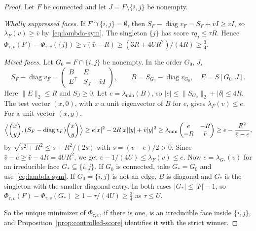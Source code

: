 \begin{proof}
Let $F$ be connected and let $J=F\setminus\{i,j\}$ be nonempty.

\emph{Wholly suppressed faces.} If $F\cap\{i,j\}=\emptyset$, then
$S_F-\operatorname{diag}v_F=S_F+\bar vI\ge\bar vI$, so $\lambda_F(v)\ge \bar v$
by~\eqref{eq:lambda-sym}. The singleton $\{j\}$ has score $\tau q_j\le\tau R$.
Hence $\Phi_{\tau,v}(F)-\Phi_{\tau,v}(\{j\})\ge\tau(\bar v-R)\ge(3R+4UR^2)/(4R)\ge\frac34$.

\emph{Mixed faces.} Let $G_0=F\cap\{i,j\}$ be nonempty. In the order $G_0$, $J$,
\[
 S_F-\operatorname{diag}v_F=\begin{pmatrix}B&E\\E^\top&S_J+\bar vI\end{pmatrix},\qquad
 B=S_{G_0}-\operatorname{diag}v_{G_0},\quad E=S[G_0,J].
\]
Here $\|E\|_2\le R$ and $S_J\ge0$. Let $e=\lambda_{\min}(B)$, so
$|e|\le\|S_{G_0}\|_2+|\delta|\le4R$. The test vector $(x,0)$, with $x$ a unit
eigenvector of $B$ for $e$, gives $\lambda_F(v)\le e$. For a unit vector $(x,y)$,
\[
 \Bigl\langle\binom xy,(S_F-\operatorname{diag}v_F)\binom xy\Bigr\rangle
 \ge e|x|^2-2R|x||y|+\bar v|y|^2\ge\lambda_{\min}\begin{pmatrix}e&-R\\-R&\bar v\end{pmatrix}
 \ge e-\frac{R^2}{\bar v-e},
\]
by $\sqrt{s^2+R^2}\le s+R^2/(2s)$ with $s=(\bar v-e)/2>0$. Since
$\bar v-e\ge \bar v-4R=4UR^2$, we get $e-1/(4U)\le\lambda_F(v)\le e$. Now
$e=\lambda_{G_*}(v)$ for an irreducible face $G_*\subseteq\{i,j\}$. If $G_0$ is
connected, take $G_*=G_0$ and use~\eqref{eq:lambda-sym}. If $G_0=\{i,j\}$ is not
an edge, $B$ is diagonal and $G_*$ is the singleton with the smaller diagonal
entry. In both cases $|G_*|\le|F|-1$, so
$\Phi_{\tau,v}(F)-\Phi_{\tau,v}(G_*)\ge1-\tau/(4U)\ge\frac34$ as $\tau\le U$.

So the unique minimizer of $\Phi_{\tau,v}$, if there is one, is an irreducible
face inside $\{i,j\}$, and Proposition~\ref{prop:controlled-score} identifies it
with the strict winner.
\end{proof}

